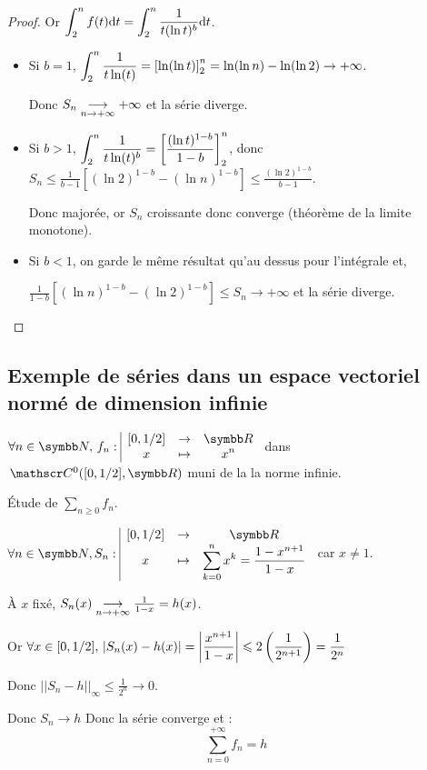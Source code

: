\begin{proof}
    Or $\displaystyle \int_{2}^{n} f(t) \text d t = \int_{2}^{n} \frac 1 {t (\ln t)^b} \text d t$.

    \begin{itemize}
        \item Si $b = 1$,
        $\displaystyle \int_2^n \frac 1 {t\ln(t)} = \left[ \ln(\ln t) \right]_{2}^{n} = \ln(\ln n) - \ln(\ln 2) \to + \infty$.
        
        Donc $S_n \underset{n \to + \infty}{\longrightarrow} + \infty$ et la série diverge.

        \item Si $b > 1$, 
        $\displaystyle \int_2^n \frac 1 {t\ln(t)^b} = \left[ \frac{(\ln t)^{1 - b}}{1 - b} \right]_{2}^{n}$, 
        donc $S_n \leqslant \frac 1 {b - 1} \left[ (\ln 2)^{1 - b} - (\ln n)^{1 - b} \right] \leqslant \frac{(\ln 2)^{1 - b}}{b - 1}$.

        Donc majorée, or $S_n$ croissante donc converge (théorème de la limite monotone).

        \item Si $b < 1$, on garde le même résultat qu'au dessus pour l'intégrale et,
        
        $\frac 1 {1 - b} \left[ (\ln n)^{1 - b} - (\ln 2)^{1 - b} \right] \leqslant S_n \to + \infty$
        et la série diverge. 
    \end{itemize}
\end{proof}

\subsection{Exemple de séries dans un espace vectoriel normé de dimension infinie}


$\forall n \in \N, \, \fonction{f_n}{[0, 1 / 2]}{\R}{x}{x^n}$ dans $\mc0([0, 1 / 2], \R)$ 
muni de la la norme infinie. 

Étude de $\sum_{n \geqslant 0} f_n$.

\avspace $\forall n \in \N, \fonction{S_n}{[0, 1 / 2]} \R x {\sum_{k = 0}^n x^k = \frac{1 - x^{n + 1}}{1 - x}}$ car $x \neq 1$. 

\avspace À $x$ fixé, $S_n(x) \underset{n \to + \infty}{\longrightarrow} \frac 1 {1 - x} = h(x)$.

Or $\displaystyle \forall x \in [0, 1 / 2], \, \left|S_n(x) - h(x)\right| = \left|\frac{x^{n + 1}}{1 - x}\right| \leqslant 2 \left( \frac 1 {2^{n + 1}} \right) = \frac 1 {2^n}$

Donc $|| S_n - h ||_\infty \leqslant \frac 1 {2^n} \longrightarrow 0$.

Donc $S_n \longrightarrow h$ Donc la série converge et :
\[\sum_{n = 0}^{+\infty} f_n = h\]

